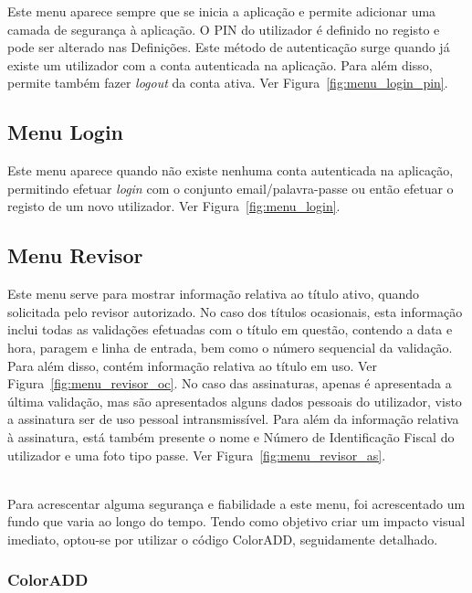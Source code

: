 Este menu aparece sempre que se inicia a aplicação e permite adicionar uma camada de segurança à aplicação. O PIN do utilizador é definido no registo e pode ser alterado nas Definições. Este método de autenticação surge quando já existe um utilizador com a conta autenticada na aplicação. Para além disso, permite também fazer \emph{logout} da conta ativa. Ver Figura~\ref{fig:menu_login_pin}.

\subsection{Menu Login}

Este menu aparece quando não existe nenhuma conta autenticada na aplicação, permitindo efetuar \emph{login} com o conjunto email/palavra-passe ou então efetuar o registo de um novo utilizador. Ver Figura~\ref{fig:menu_login}.

\subsection{Menu Revisor}

Este menu serve para mostrar informação relativa ao título ativo, quando solicitada pelo revisor autorizado. No caso dos títulos ocasionais, esta informação inclui todas as validações efetuadas com o título em questão, contendo a data e hora, paragem e linha de entrada, bem como o número sequencial da validação. Para além disso, contém informação relativa ao título em uso. Ver Figura~\ref{fig:menu_revisor_oc}. No caso das assinaturas, apenas é apresentada a última validação, mas são apresentados alguns dados pessoais do utilizador, visto a assinatura ser de uso pessoal intransmissível. Para além da informação relativa à assinatura, está também presente o nome e Número de Identificação Fiscal do utilizador e uma foto tipo passe. Ver Figura~\ref{fig:menu_revisor_as}.

~\\Para acrescentar alguma segurança e fiabilidade a este menu, foi acrescentado um fundo que varia ao longo do tempo. Tendo como objetivo criar um impacto visual imediato, optou-se por utilizar o código ColorADD, seguidamente detalhado.

\subsubsection{ColorADD}

